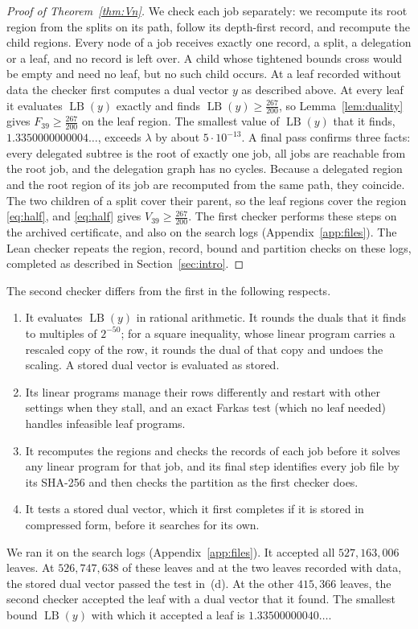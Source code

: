 \documentclass[11pt]{amsart}
\theoremstyle{definition}
\theoremstyle{remark}
\numberwithin{equation}{section}
\newcommand{\LB}{\operatorname{LB}}
\newcommand{\LAM}{\tfrac{267}{200}}
\newcommand{\Nbins}{39}
\newcommand{\Nleaves}{527{,}163{,}006}
\newcommand{\MinLeaf}{1.3350000000004\ldots}
\newcommand{\MinLeafGap}{5\cdot10^{-13}}
\newcommand{\MinLeafIndep}{1.33500000040\ldots}
\begin{document}
\begin{proof}[Proof of Theorem~\ref{thm:Vn}]
We check each job separately: we recompute its root region from the splits on its path, follow its depth-first record, and recompute the child regions. Every node of a job receives exactly one record, a split, a delegation or a leaf, and no record is left over. A child whose tightened bounds cross would be empty and need no leaf, but no such child occurs. At a leaf recorded without data the checker first computes a dual vector $y$ as described above. At every leaf it evaluates $\LB(y)$ exactly and finds $\LB(y)\ge\LAM$, so Lemma~\ref{lem:duality} gives $F_{\Nbins}\ge\LAM$ on the leaf region. The smallest value of $\LB(y)$ that it finds, $\MinLeaf$, exceeds $\lambda$ by about $\MinLeafGap$. A final pass confirms three facts: every delegated subtree is the root of exactly one job, all jobs are reachable from the root job, and the delegation graph has no cycles. Because a delegated region and the root region of its job are recomputed from the same path, they coincide. The two children of a split cover their parent, so the leaf regions cover the region \eqref{eq:half}, and \eqref{eq:half} gives $V_{\Nbins}\ge\LAM$. The first checker performs these steps on the archived certificate, and also on the search logs (Appendix~\ref{app:files}). The Lean checker repeats the region, record, bound and partition checks on these logs, completed as described in Section~\ref{sec:intro}.
\end{proof}

The second checker differs from the first in the following respects.
\begin{enumerate}[label=(\alph*)]
\item It evaluates $\LB(y)$ in rational arithmetic. It rounds the duals that it finds to multiples of $2^{-50}$; for a square inequality, whose linear program carries a rescaled copy of the row, it rounds the dual of that copy and undoes the scaling. A stored dual vector is evaluated as stored.
\item Its linear programs manage their rows differently and restart with other settings when they stall, and an exact Farkas test (which no leaf needed) handles infeasible leaf programs.
\item It recomputes the regions and checks the records of each job before it solves any linear program for that job, and its final step identifies every job file by its SHA-256 and then checks the partition as the first checker does.
\item It tests a stored dual vector, which it first completes if it is stored in compressed form, before it searches for its own.
\end{enumerate}
We ran it on the search logs (Appendix~\ref{app:files}). It accepted all $\Nleaves$ leaves. At $526{,}747{,}638$ of these leaves and at the two leaves recorded with data, the stored dual vector passed the test in~(d). At the other $415{,}366$ leaves, the second checker accepted the leaf with a dual vector that it found. The smallest bound $\LB(y)$ with which it accepted a leaf is $\MinLeafIndep$.
\end{document}
